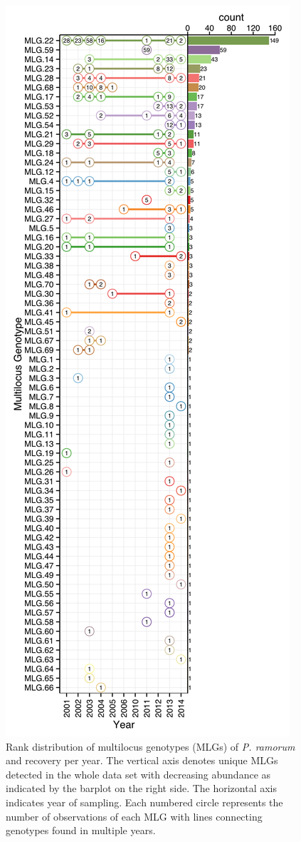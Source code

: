 \documentclass[double,12pt]{beavtex}
\begin{document}
  \begin{figure}
  
  {\centering \includegraphics[width=0.4\linewidth]{figure/phytopathology/figure_2} 
  
  }
  
  \caption[Rank distribution of multilocus genotypes (MLGs) of \emph{P. ramorum}
  and recovery per year.]{Rank distribution of multilocus genotypes (MLGs) of \emph{P. ramorum}
  and recovery per year. The vertical axis denotes unique MLGs detected in
  the whole data set with decreasing abundance as indicated by the barplot
  on the right side. The horizontal axis indicates year of sampling. Each
  numbered circle represents the number of observations of each MLG with
  lines connecting genotypes found in multiple years.}\label{fig:ramorum2}
  \end{figure}
  
  \newpage
  
\end{document}
